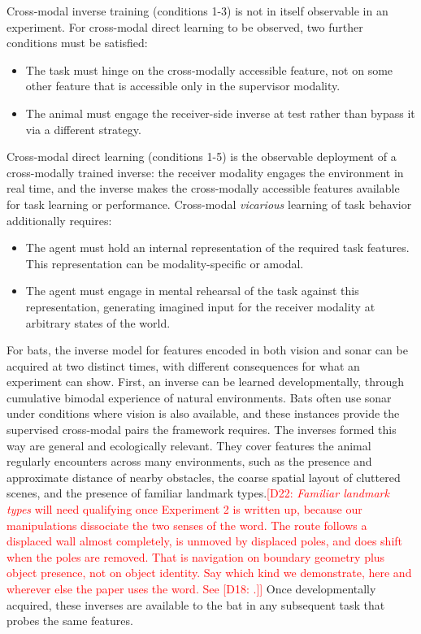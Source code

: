 \documentclass[11pt]{article}
\newcommand{\dnote}[2][]{\textcolor{red}{[D#1: #2]}}
\begin{document}
Cross-modal inverse training (conditions 1-3) is not in itself observable in an experiment. For cross-modal direct learning to be observed, two further conditions must be satisfied:
%
\begin{itemize}
\item[4] The task must hinge on the cross-modally accessible feature, not on some other feature that is accessible only in the supervisor modality.
\item[5] The animal must engage the receiver-side inverse at test rather than bypass it via a different strategy.
\end{itemize}


Cross-modal direct learning (conditions 1-5) is the observable deployment of a cross-modally trained inverse: the receiver modality engages the environment in real time, and the inverse makes the cross-modally accessible features available for task learning or performance. Cross-modal \emph{vicarious} learning of task behavior additionally requires:
%
\begin{itemize}
\item[6] The agent must hold an internal representation of the required task features. This representation can be modality-specific or amodal.
\item[7] The agent must engage in mental rehearsal of the task against this representation, generating imagined input for the receiver modality at arbitrary states of the world.
\end{itemize}


For bats, the inverse model for features encoded in both vision and sonar can be acquired at two distinct times, with different consequences for what an experiment can show. First, an inverse can be learned developmentally, through cumulative bimodal experience of natural environments. Bats often use sonar under conditions where vision is also available, and these instances provide the supervised cross-modal pairs the framework requires. The inverses formed this way are general and ecologically relevant. They cover features the animal regularly encounters across many environments, such as the presence and approximate distance of nearby obstacles, the coarse spatial layout of cluttered scenes, and the presence of familiar landmark types.\dnote[22]{\emph{Familiar landmark types} will need qualifying once Experiment 2 is written up, because our manipulations dissociate the two senses of the word. The route follows a displaced wall almost completely, is unmoved by displaced poles, and does shift when the poles are removed. That is navigation on boundary geometry plus object presence, not on object identity. Say which kind we demonstrate, here and wherever else the paper uses the word. See \dnote[18].} Once developmentally acquired, these inverses are available to the bat in any subsequent task that probes the same features.
\end{document}
